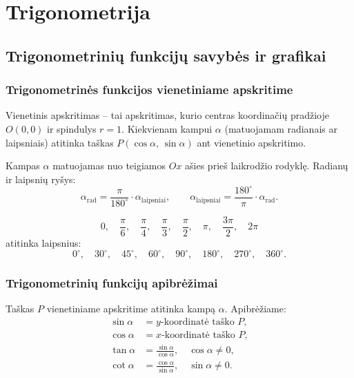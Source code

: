 \chapter{Trigonometrija}

\section{Trigonometrinių funkcijų savybės ir grafikai}

\subsection{Trigonometrinės funkcijos vienetiniame apskritime}

\begin{definition}
Vienetinis apskritimas – tai apskritimas, kurio centras koordinačių pradžioje \(O(0,0)\) ir spindulys \(r = 1\). Kiekvienam kampui \(\alpha\) (matuojamam radianais ar laipsniais) atitinka taškas \(P(\cos\alpha,\, \sin\alpha)\) ant vienetinio apskritimo.
\end{definition}

Kampas \(\alpha\) matuojamas nuo teigiamos \(Ox\) ašies prieš laikrodžio rodyklę. Radianų ir laipsnių ryšys:
\[
\alpha_{\text{rad}} = \frac{\pi}{180^\circ} \cdot \alpha_{\text{laipsniai}}, \qquad \alpha_{\text{laipsniai}} = \frac{180^\circ}{\pi} \cdot \alpha_{\text{rad}}.
\]

\begin{tcolorbox}[title=Pagrindiniai kampų radianai]
\[
0,\quad \frac{\pi}{6},\quad \frac{\pi}{4},\quad \frac{\pi}{3},\quad \frac{\pi}{2},\quad \pi,\quad \frac{3\pi}{2},\quad 2\pi
\]
atitinka laipsnius:
\[
0^\circ,\quad 30^\circ,\quad 45^\circ,\quad 60^\circ,\quad 90^\circ,\quad 180^\circ,\quad 270^\circ,\quad 360^\circ.
\]
\end{tcolorbox}

\subsection{Trigonometrinių funkcijų apibrėžimai}

\begin{definition}
Taškas \(P\) vienetiniame apskritime atitinka kampą \(\alpha\). Apibrėžiame:
\begin{align*}
\sin\alpha &= y\text{-koordinatė taško }P,\\
\cos\alpha &= x\text{-koordinatė taško }P,\\
\tan\alpha &= \frac{\sin\alpha}{\cos\alpha}, \quad \cos\alpha \neq 0,\\
\cot\alpha &= \frac{\cos\alpha}{\sin\alpha}, \quad \sin\alpha \neq 0.
\end{align*}
\end{definition}

